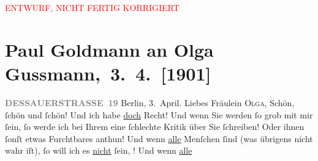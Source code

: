 
\begin{center}
            \textcolor{red}{ENTWURF, NICHT FERTIG KORRIGIERT}
                      \end{center}
            
         
         \renewcommand{\erwaehntePersonen}{Personen: Marie Glümer, Olga Schnitzler, Elisabeth Steinrück, Ernst von Wolzogen}
         \renewcommand{\erwaehnteInstitutionen}{Institutionen: Überbrettl}
         \renewcommand{\erwaehnteOrte}{Orte: Berlin, Dessauer Straße, Wien}
         \renewcommand{\erwaehnteWerke}{}
               \section[ Paul Goldmann an Olga Gussmann, 3. 4. {[}1901{]}]{ Paul Goldmann an Olga Gussmann, 3. 4. {[}1901{]}}\nopagebreak{}\rehead{ }\begin{ledgroupsized}[t]{13cm}\normalsize\beginnumbering \toendnotes[C]{\smallbreak\pagebreak[2]} 
\toendnotes[C]{\smallbreak}\pstart
           \noindent{}\raggedleft{}{\pb}\textcolor{gray}{\textbf{DESSAUERSTRASSE 19}}\pend
           \pstart
           Berlin, 3. April.\pend
           \pstart\center{}Liebes Fräulein \textsc{Olga},\pend\pstart
           Schön, ſchön und ſchön! Und ich habe \uline{doch} Recht! Und
               wenn Sie werden ſo grob mit mir ſein, ſo werde ich bei Ihrem \label{K_L03525-1v}\label{K_L03525-1h} eine
               ſchlechte Kritik über Sie ſchreiben! Oder ihnen ſonſt etwas Furchtbares anthun! Und
               wenn \uline{alle} Menſchen \label{K_L03525-2v}\label{K_L03525-2h} ſind (was übrigens nicht wahr iſt), ſo will ich es \uline{nicht} ſein, \label{K_L03525-3v}\label{K_L03525-3h}! Und wenn \uline{alle}

\end{ledgroupsized}
